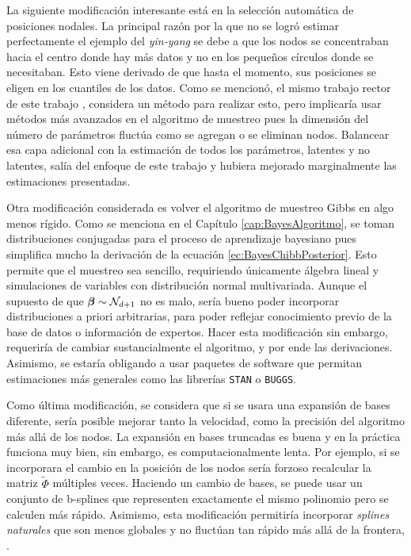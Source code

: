 \documentclass[../Main/Main.tex]{subfiles}
\begin{document}
La siguiente modificación interesante está en la selección automática de posiciones nodales. La principal razón por la que no se logró estimar perfectamente el ejemplo del \textit{yin-yang} se debe a que los nodos se concentraban hacia el centro donde hay más datos y no en los pequeños círculos donde se necesitaban. Esto viene derivado de que hasta el momento, sus posiciones se eligen en los cuantiles de los datos. Como se mencionó, el mismo trabajo rector de este trabajo \citet{mallik1998automatic}, considera un método para realizar esto, pero implicaría usar métodos más avanzados en el algoritmo de muestreo pues la dimensión del número de parámetros fluctúa como se agregan o se eliminan nodos. Balancear esa capa adicional con la estimación de todos los parámetros, latentes y no latentes, salía del enfoque de este trabajo y hubiera mejorado marginalmente las estimaciones presentadas.

Otra modificación considerada es volver el algoritmo de muestreo Gibbs en algo menos rígido. Como se menciona en el Capítulo \ref{cap:BayesAlgoritmo}, se toman distribuciones conjugadas para el proceso de aprendizaje bayesiano pues simplifica mucho la derivación de la ecuación \eqref{ec:BayesChibbPosterior}. Esto permite que el muestreo sea sencillo, requiriendo únicamente álgebra lineal y simulaciones de variables con distribución normal multivariada. Aunque el supuesto de que $\bm{\beta}\sim\mathcal{N}_{d+1}$ no es malo, sería bueno poder incorporar distribuciones a priori arbitrarias, para poder reflejar conocimiento previo de la base de datos o información de expertos. Hacer esta modificación sin embargo, requeriría de cambiar sustancialmente el algoritmo, y por ende las derivaciones. Asimismo, se estaría obligando a usar paquetes de software que permitan estimaciones más generales como las librerías \verb|STAN| o \verb|BUGGS|.

Como última modificación, se considera que si se usara una expansión de bases diferente, sería posible mejorar tanto la velocidad, como la precisión del algoritmo más allá de los nodos. La expansión en bases truncadas es buena y en la práctica funciona muy bien, sin embargo, es computacionalmente lenta. Por ejemplo, si se incorporara el cambio en la posición de los nodos sería forzoso recalcular la matriz $\tilde{\Phi}$ múltiples veces. Haciendo un cambio de bases, se puede usar un conjunto de b-splines que representen exactamente el mismo polinomio pero se calculen más rápido. Asimismo, esta modificación permitiría incorporar \textit{splines naturales} que son menos globales y no fluctúan tan rápido más allá de la frontera, \citet{wahba1990splines}. 
\end{document}
